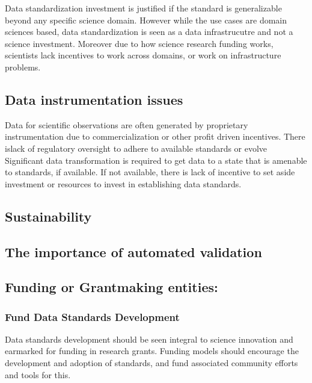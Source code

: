 \documentclass[
  letterpaper,
  DIV=11,
  numbers=noendperiod]{scrartcl}
\begin{document}
Data standardization investment is justified if the standard is
generalizable beyond any specific science domain. However while the use
cases are domain sciences based, data standardization is seen as a data
infrastrucutre and not a science investment. Moreover due to how science
research funding works, scientists lack incentives to work across
domains, or work on infrastructure problems.

\subsection{Data instrumentation
issues}\label{data-instrumentation-issues}

Data for scientific observations are often generated by proprietary
instrumentation due to commercialization or other profit driven
incentives. There islack of regulatory oversight to adhere to available
standards or evolve Significant data transformation is required to get
data to a state that is amenable to standards, if available. If not
available, there is lack of incentive to set aside investment or
resources to invest in establishing data standards.

\subsection{Sustainability}\label{sustainability}

\subsection{The importance of automated
validation}\label{the-importance-of-automated-validation}

\subsection{Funding or Grantmaking
entities:}\label{funding-or-grantmaking-entities}

\subsubsection{Fund Data Standards
Development}\label{fund-data-standards-development}

Data standards development should be seen integral to science innovation
and earmarked for funding in research grants. Funding models should
encourage the development and adoption of standards, and fund associated
community efforts and tools for this.
\end{document}
